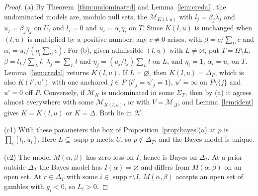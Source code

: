 \documentclass[11pt]{article}
\theoremstyle{remark}\newtheorem{remark}[theorem]{Remark}
\newcommand{\M}{\mathcal M}
\newcommand{\K}{\mathcal K}
\newcommand{\supp}{\operatorname{supp}}
\begin{document}
\begin{proof}
(a) By Theorem~\ref{thm:undominated} and Lemma~\ref{lem:credal}, the
undominated models are, modulo null sets, the $\M_{K(l,u)}$ with
$l_j=\beta_j\lambda_j$ and $u_j=\beta_j\eta_j$ on $U$, and $l_i=0$ and
$u_i=\alpha_i\eta_i$ on $T$. Since $K(l,u)$ is unchanged when $(l,u)$ is
multiplied by a positive number, any $c\ne0$ arises, with $\beta=c/\sum_Uc$
and $\alpha_i=u_i/(\eta_i\sum_Uc)$. For (b),
given admissible $(l,u)$ with $L\ne\varnothing$, put $T=\Omega\setminus L$,
$\beta=l_L/\sum_Ll$, $\lambda_j=\sum_Ll$ and $\eta_j=(u_j/l_j)\sum_Ll$ on
$L$, and $\eta_i=1$, $\alpha_i=u_i$ on $T$. Lemma~\ref{lem:credal} returns
$K(l,u)$. If $L=\varnothing$, then $K(l,u)=\Delta_P$, which is also
$K(l',u')$ with one anchored $j\in P$ ($l'_j=u'_j=1$), $u'=\infty$ on
$P\setminus\{j\}$ and $u'=0$ off $P$. Conversely, if $\M_K$ is
undominated in some $\Sigma_T$, then by (a) it agrees almost everywhere
with some $\M_{K(l,u)}$, or with $V=\M_\Delta$, and Lemma~\ref{lem:ident}
gives $K=K(l,u)$ or $K=\Delta$. Both lie in $\K$.

(c1) With these parameters the box of Proposition~\ref{prop:bayes}(a) at
$p$ is $\prod_i[l_i,u_i]$. Here $L\subseteq\supp p$ meets $U$, so
$p\notin\Delta_T$, and the Bayes model is unique.

(c2) The model $M(\alpha,\beta)$ has zero loss on $I$, hence is Bayes on
$\Delta_I$. At a prior outside $\Delta_T$ the
Bayes model has $I(\alpha)=\varnothing$ and differs from $M(\alpha,\beta)$
on an open set. At $r\in\Delta_T$ with some $i\in\supp r\setminus I$,
$M(\alpha,\beta)$ accepts an open set of gambles with $g_i<0$, so
$L_i>0$.
\end{proof}
\end{document}
